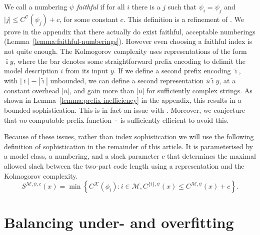 \documentclass{style/llncs}
\newcommand{\M}{\mathscr M}
\newcommand{\C}{\mathscr C}
\newcommand{\K}{\mathscr K}
\newcommand{\br}[1]{\overline{#1}}
\begin{document}
We call a numbering $\psi$ \emph{faithful} if for all $i$ there is a $j$ such that $\psi_i=\psi_j$ and $|j|\le C^{\C}(\psi_j)+c$, for some constant $c$. This definition is a refinement of \cite[Definition~10]{adriaans2012facticity}. We prove in the appendix that there actually do exist faithful, acceptable numberings (Lemma~\ref{lemma:faithful-numberings}). However even choosing a faithful index is not quite enough. The Kolmogorov complexity uses representations of the form $\bar\imath y$, where the bar denotes some straightforward prefix encoding to delimit the model description $i$ from its input $y$. If we define a second prefix encoding $\tilde{\imath}$, with $|\bar\imath|-|\tilde\imath|$ unbounded, we can define a second representation $\bar u \tilde \imath y$, at a constant overhead $|\br{u}|$, and gain more than $|\br{u}|$ for sufficiently complex strings. As shown in Lemma~\ref{lemma:prefix-inefficiency} in the appendix, this results in a bounded sophistication. 
This is in fact an issue with \cite{adriaans2012facticity}. Moreover, we conjecture that \emph{no} computable prefix function $\bar\cdot$ is sufficiently efficient to avoid this.

Because of these issues, rather than index sophistication we will use the following definition of sophistication in the remainder of this article. It is parameterised by a model class, a numbering, and a slack parameter $c$ that determines the maximal allowed slack between the two-part code length using a representation and the Kolmogorov complexity.
\[
S^{\M,\psi,c}(x)=\min\left\{C^\K(\phi_i):i\in\M,C^{\{i\},\psi}(x)\le C^{\M,\psi}(x)+c\right\}.
\]

\section{Balancing under- and overfitting}
\label{section:balance}
\end{document}
